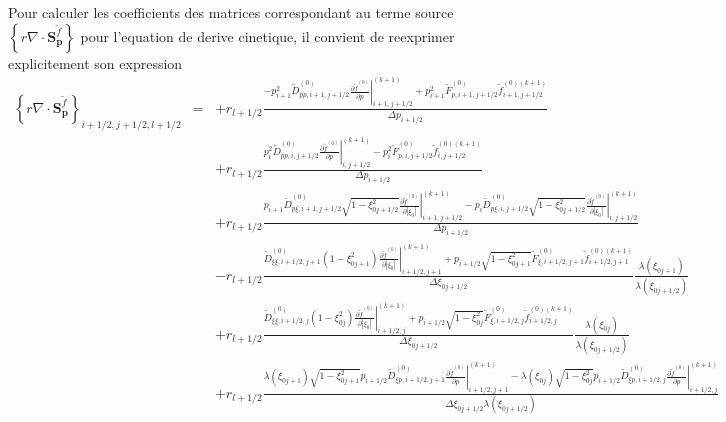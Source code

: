 Pour calculer les coefficients des matrices correspondant au terme
source $\left\{ r\nabla\cdot\mathbf{S}_{\mathbf{p}}^{\widetilde{f}}\right\} $
pour l'equation de derive cinetique, il convient de reexprimer explicitement
son expression \begin{eqnarray*}
\left\{ r\nabla\cdot\mathbf{S}_{\mathbf{p}}^{\widetilde{f}}\right\} _{i+1/2,j+1/2,l+1/2} & = & +r_{l+1/2}\frac{-p_{i+1}^{2}\widetilde{D}_{pp,i+1,j+1/2}^{\left(0\right)}\left.\frac{\partial\widetilde{f}^{\left(0\right)}}{\partial p}\right|_{i+1,j+1/2}^{(k+1)}+p_{i+1}^{2}\widetilde{F}_{p,i+1,j+1/2}^{\left(0\right)}\widetilde{f}_{i+1,j+1/2}^{\left(0\right)(k+1)}}{\Delta p_{i+1/2}}\\
 &  & +r_{l+1/2}\frac{p_{i}^{2}\widetilde{D}_{pp,i,j+1/2}^{\left(0\right)}\left.\frac{\partial\widetilde{f}^{\left(0\right)}}{\partial p}\right|_{i,j+1/2}^{(k+1)}-p_{i}^{2}\widetilde{F}_{p,i,j+1/2}^{\left(0\right)}\widetilde{f}_{i,j+1/2}^{\left(0\right)(k+1)}}{\Delta p_{i+1/2}}\\
 &  & +r_{l+1/2}\frac{p_{i+1}\widetilde{D}_{p\xi,i+1,j+1/2}^{\left(0\right)}\sqrt{1-\xi_{0j+1/2}^{2}}\left.\frac{\partial\widetilde{f}^{\left(0\right)}}{\partial\left|\xi_{0}\right|}\right|_{i+1,j+1/2}^{(k+1)}-p_{i}\widetilde{D}_{p\xi,i,j+1/2}^{\left(0\right)}\sqrt{1-\xi_{0j+1/2}^{2}}\left.\frac{\partial\widetilde{f}^{\left(0\right)}}{\partial\left|\xi_{0}\right|}\right|_{i,j+1/2}^{(k+1)}}{\Delta p_{i+1/2}}\\
 &  & -r_{l+1/2}\frac{\widetilde{D}_{\xi\xi,i+1/2,j+1}^{\left(0\right)}\left(1-\xi_{0j+1}^{2}\right)\left.\frac{\partial\widetilde{f}^{\left(0\right)}}{\partial\left|\xi_{0}\right|}\right|_{i+1/2,j+1}^{(k+1)}+p_{i+1/2}\sqrt{1-\xi_{0j+1}^{2}}\widetilde{F}_{\xi,i+1/2,j+1}^{\left(0\right)}\widetilde{f}_{i+1/2,j+1}^{\left(0\right)(k+1)}}{\Delta\xi_{0j+1/2}}\frac{\lambda\left(\xi_{0j+1}\right)}{\lambda\left(\xi_{0j+1/2}\right)}\\
 &  & +r_{l+1/2}\frac{\widetilde{D}_{\xi\xi,i+1/2,j}^{\left(0\right)}\left(1-\xi_{0j}^{2}\right)\left.\frac{\partial\widetilde{f}^{\left(0\right)}}{\partial\left|\xi_{0}\right|}\right|_{i+1/2,j}^{(k+1)}+p_{i+1/2}\sqrt{1-\xi_{0j}^{2}}\widetilde{F}_{\xi,i+1/2,j}^{\left(0\right)}\widetilde{f}_{i+1/2,j}^{\left(0\right)(k+1)}}{\Delta\xi_{0j+1/2}}\frac{\lambda\left(\xi_{0j}\right)}{\lambda\left(\xi_{0j+1/2}\right)}\\
 &  & +r_{l+1/2}\frac{\lambda\left(\xi_{0j+1}\right)\sqrt{1-\xi_{0j+1}^{2}}p_{i+1/2}\widetilde{D}_{\xi p,i+1/2,j+1}^{\left(0\right)}\left.\frac{\partial\widetilde{f}^{\left(0\right)}}{\partial p}\right|_{i+1/2,j+1}^{(k+1)}-\lambda\left(\xi_{0j}\right)\sqrt{1-\xi_{0j}^{2}}p_{i+1/2}\widetilde{D}_{\xi p,i+1/2,j}^{\left(0\right)}\left.\frac{\partial\widetilde{f}^{\left(0\right)}}{\partial p}\right|_{i+1/2,j}^{(k+1)}}{\Delta\xi_{0j+1/2}\lambda\left(\xi_{0j+1/2}\right)}\end{eqnarray*}


